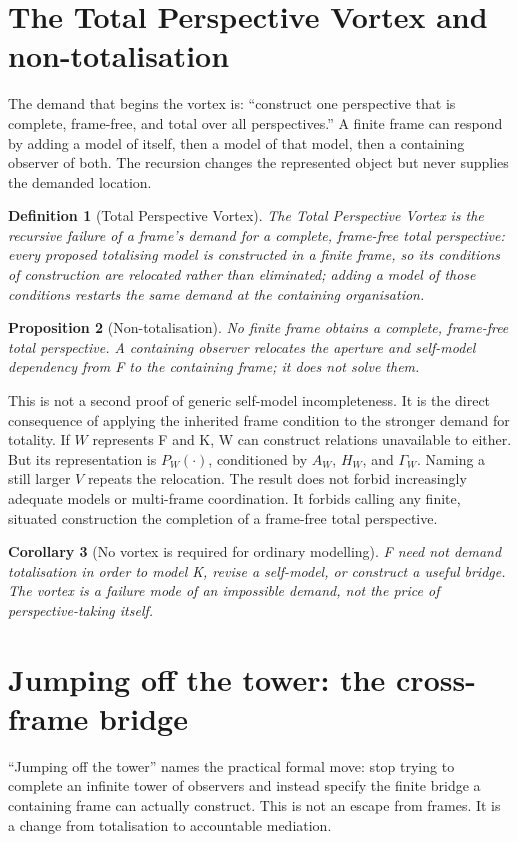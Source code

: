 \documentclass[11pt,a4paper]{article}
\newtheorem{definition}{Definition}[section]
\newtheorem{proposition}[definition]{Proposition}
\newtheorem{corollary}[definition]{Corollary}
\theoremstyle{remark}
\begin{document}
\section{The Total Perspective Vortex and non-totalisation}\label{sec:vortex}
The demand that begins the vortex is: ``construct one perspective that is
complete, frame-free, and total over all perspectives.'' A finite frame can
respond by adding a model of itself, then a model of that model, then a
containing observer of both. The recursion changes the represented object but
never supplies the demanded location.

\begin{definition}[Total Perspective Vortex]
The \emph{Total Perspective Vortex} is the recursive failure of a frame's demand
for a complete, frame-free total perspective: every proposed totalising model is
constructed in a finite frame, so its conditions of construction are relocated
rather than eliminated; adding a model of those conditions restarts the same
demand at the containing organisation.
\end{definition}

\begin{proposition}[Non-totalisation]\label{prop:nontotalisation}
No finite frame obtains a complete, frame-free total perspective. A containing
observer relocates the aperture and self-model dependency from F to the
containing frame; it does not solve them.
\end{proposition}

This is not a second proof of generic self-model incompleteness. It is the direct
consequence of applying the inherited frame condition to the stronger demand for
totality. If $W$ represents F and K, W can construct relations unavailable to
either. But its representation is $P_W(\cdot)$, conditioned by $A_W$, $H_W$, and
$\Gamma_W$. Naming a still larger $V$ repeats the relocation. The result does
not forbid increasingly adequate models or multi-frame coordination. It forbids
calling any finite, situated construction the completion of a frame-free total
perspective.

\begin{corollary}[No vortex is required for ordinary modelling]
F need not demand totalisation in order to model K, revise a self-model, or
construct a useful bridge. The vortex is a failure mode of an impossible demand,
not the price of perspective-taking itself.
\end{corollary}

\section{Jumping off the tower: the cross-frame bridge}\label{sec:bridge}
``Jumping off the tower'' names the practical formal move: stop trying to
complete an infinite tower of observers and instead specify the finite bridge a
containing frame can actually construct. This is not an escape from frames. It
is a change from totalisation to accountable mediation.
\end{document}
